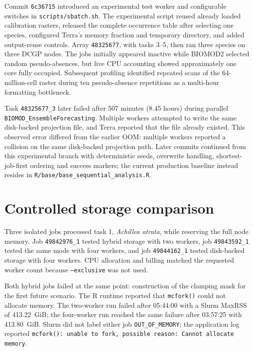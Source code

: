 Commit \texttt{6c36715} introduced an experimental test worker and configurable switches in \nolinkurl{scripts/sbatch.sh}. The experimental script reused already loaded calibration rasters, released the complete occurrence table after selecting one species, configured Terra's memory fraction and temporary directory, and added output-reuse controls. Array \texttt{48325677}, with tasks 3--5, then ran three species on three DCGP nodes. The jobs initially appeared inactive while BIOMOD2 selected random pseudo-absences, but live CPU accounting showed approximately one core fully occupied. Subsequent profiling identified repeated scans of the 64-million-cell raster during ten pseudo-absence repetitions as a multi-hour formatting bottleneck.

Task \texttt{48325677\_3} later failed after 507 minutes (8.45 hours) during parallel \nolinkurl{BIOMOD_EnsembleForecasting}. Multiple workers attempted to write the same disk-backed projection file, and Terra reported that the file already existed. This observed error differed from the earlier OOM: multiple workers reported a collision on the same disk-backed projection path. Later commits continued from this experimental branch with deterministic seeds, overwrite handling, shortest-job-first ordering and success markers; the current production baseline instead resides in \nolinkurl{R/base/base_sequential_analysis.R}.

\section{Controlled storage comparison}

Three isolated jobs processed task 1, \emph{Achillea atrata}, while reserving the full node memory. Job \texttt{49842976\_1} tested hybrid storage with two workers, job \texttt{49843592\_1} tested the same mode with four workers, and job \texttt{49844162\_1} tested disk-backed storage with four workers. CPU allocation and billing matched the requested worker count because \texttt{--exclusive} was not used.

Both hybrid jobs failed at the same point: construction of the clamping mask for the first future scenario. The R runtime reported that \texttt{mcfork()} could not allocate memory. The two-worker run failed after 05:44:00 with a Slurm MaxRSS of 413.22~GiB; the four-worker run reached the same failure after 03:57:25 with 413.80~GiB. Slurm did not label either job \texttt{OUT\_OF\_MEMORY}; the application log reported \texttt{mcfork(): unable to fork, possible reason: Cannot allocate memory}.

